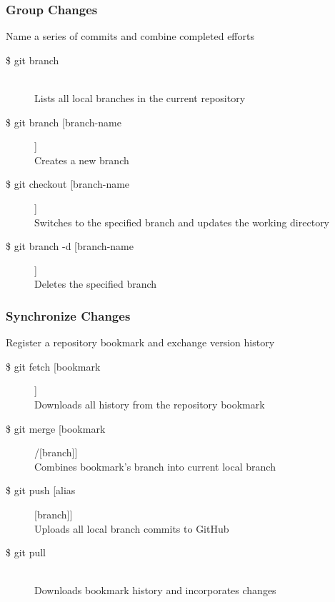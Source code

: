 \subsubsection{Group Changes}
Name a series of commits and combine completed efforts

\begin{description}

\item [\$ git branch] \leavevmode \\
Lists all local branches in the current repository

\item [\$ git branch [branch-name]]\\
Creates a new branch

\item [\$ git checkout [branch-name]]\\
Switches to the specified branch and updates the working directory

\item [\$ git branch -d [branch-name]]\\
Deletes the specified branch\\

\end{description}


\subsubsection{Synchronize Changes}
Register a repository bookmark and exchange version history

\begin{description}

\item [\$ git fetch [bookmark]]\\
Downloads all history from the repository bookmark

\item [\$ git merge [bookmark]/[branch]]\\
Combines bookmark’s branch into current local branch

\item [\$ git push [alias][branch]]\\
Uploads all local branch commits to GitHub

\item [\$ git pull] \leavevmode \\
Downloads bookmark history and incorporates changes

\end{description}


